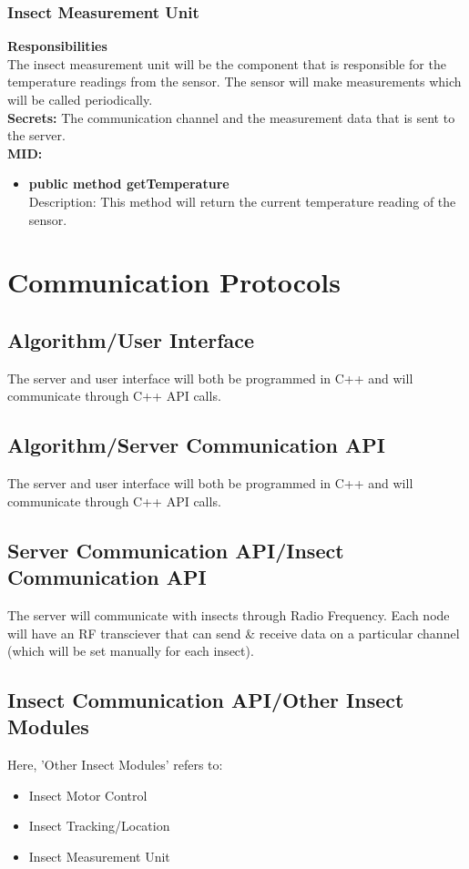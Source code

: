 \documentclass[11pt]{article}
\begin{document}
\subsubsection{Insect Measurement Unit}
\textbf{Responsibilities}\\
The insect measurement unit will be the component that is responsible for the temperature readings from the sensor. The sensor will make measurements which will be called periodically. \\
\newline
\textbf{Secrets: }The communication channel and the measurement data that is sent to the server. \\
\textbf{MID:}
\begin{itemize}
    \item \textbf{public method getTemperature} \\ Description: This method will return the current temperature reading of the sensor.
\end{itemize}

\section{Communication Protocols}
\subsection{Algorithm/User Interface}
The server and user interface will both be programmed in C++ and will communicate through C++ API calls.
\subsection{Algorithm/Server Communication API}
The server and user interface will both be programmed in C++ and will communicate through C++ API calls.
\subsection{Server Communication API/Insect Communication API}
The server will communicate with insects through Radio Frequency. Each node will have an RF transciever that can send & receive
data on a particular channel (which will be set manually for each insect).
\subsection{Insect Communication API/Other Insect Modules}
Here, 'Other Insect Modules' refers to:
\begin{itemize}
    \item Insect Motor Control
    \item Insect Tracking/Location
    \item Insect Measurement Unit
\end{itemize}
\end{document}

